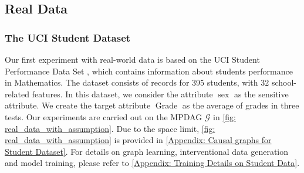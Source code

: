 \documentclass{article} %
\begin{document}





\subsection{Real Data}
\subsubsection{The UCI Student Dataset} \label{sec: The UCI Student Dataset}

Our first experiment with real-world data is based on the UCI Student Performance Data Set \citep{cortez2008using}, which contains information about students performance in Mathematics. The dataset consists of records for 395 students, with $32$ %
school-related features. In this dataset, we consider the attribute $\operatorname{sex}$ as the sensitive attribute. We create the target attribute $\operatorname{Grade}$ as the average of grades in three tests. Our experiments are carried out on the MPDAG $\mathcal{G}$ in \cref{fig: real_data_with_assumption}. Due to the space limit, \cref{fig: real_data_with_assumption} is provided in \cref{Appendix: Causal graphs for Student Dataset}. For details on graph learning, interventional data generation and model training, please refer to \cref{Appendix: Training Details on Student Data}.
\end{document}
